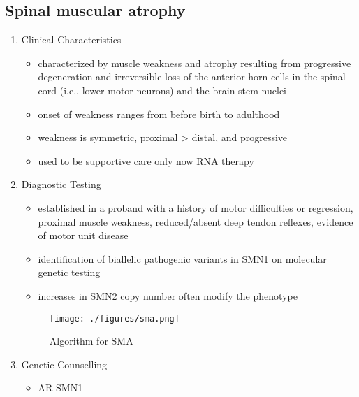 \documentclass[12pt]{scrartcl}
\begin{document}
\subsection{Spinal muscular atrophy}
\label{sec:orgf9cdcaf}
\begin{enumerate}
\item Clinical Characteristics
\label{sec:org4e8962d}
\begin{itemize}
\item characterized by muscle weakness and atrophy resulting from
progressive degeneration and irreversible loss of the anterior horn
cells in the spinal cord (i.e., lower motor neurons) and the brain
stem nuclei
\item onset of weakness ranges from before birth to adulthood
\item weakness is symmetric, proximal \textgreater{} distal, and progressive
\item used to be supportive care only now RNA therapy
\end{itemize}

\item Diagnostic Testing
\label{sec:org3546f52}
\begin{itemize}
\item established in a proband with a history of motor difficulties or
regression, proximal muscle weakness, reduced/absent deep tendon
reflexes, evidence of motor unit disease
\item identification of biallelic pathogenic variants in SMN1 on
molecular genetic testing
\item increases in SMN2 copy number often modify the phenotype
\end{itemize}

\begin{figure}[htbp]
\centering
\texttt{[image: ./figures/sma.png]}
\caption{\label{fig:orgee44fb3}Algorithm for SMA}
\end{figure}

\item Genetic Counselling
\label{sec:orgfe4cd3d}
\begin{itemize}
\item AR SMN1
\end{itemize}
\end{enumerate}
\end{document}

